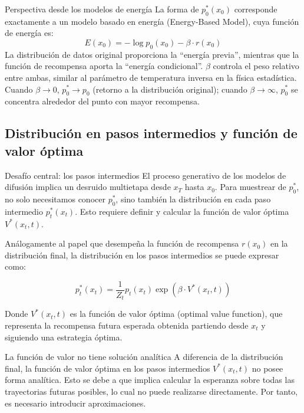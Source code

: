 \documentclass[a4paper]{article}
\begin{document}
\begin{knowledgebox}{Perspectiva desde los modelos de energía}
La forma de $p_0^*(x_0)$ corresponde exactamente a un modelo basado en energía (Energy-Based Model), cuya función de energía es:
$$E(x_0) = -\log p_0(x_0) - \beta \cdot r(x_0)$$
La distribución de datos original proporciona la ``energía previa'', mientras que la función de recompensa aporta la ``energía condicional''. $\beta$ controla el peso relativo entre ambas, similar al parámetro de temperatura inversa en la física estadística. Cuando $\beta \to 0$, $p_0^* \to p_0$ (retorno a la distribución original); cuando $\beta \to \infty$, $p_0^*$ se concentra alrededor del punto con mayor recompensa.
\end{knowledgebox}

\subsection{Distribución en pasos intermedios y función de valor óptima}

\begin{importantbox}{Desafío central: los pasos intermedios}
El proceso generativo de los modelos de difusión implica un desruido multietapa desde $x_T$ hasta $x_0$. Para muestrear de $p_0^*$, no solo necesitamos conocer $p_0^*$, sino también la distribución en cada paso intermedio $p_t^*(x_t)$. Esto requiere definir y calcular la función de valor óptima $V^*(x_t, t)$.
\end{importantbox}

Análogamente al papel que desempeña la función de recompensa $r(x_0)$ en la distribución final, la distribución en los pasos intermedios se puede expresar como:

$$p_t^*(x_t) = \frac{1}{Z_t} p_t(x_t) \exp(\beta \cdot V^*(x_t, t))$$

Donde $V^*(x_t, t)$ es la función de valor óptima (optimal value function), que representa la recompensa futura esperada obtenida partiendo desde $x_t$ y siguiendo una estrategia óptima.

\begin{warningbox}{La función de valor no tiene solución analítica}
A diferencia de la distribución final, la función de valor óptima en los pasos intermedios $V^*(x_t, t)$ no posee forma analítica. Esto se debe a que implica calcular la esperanza sobre todas las trayectorias futuras posibles, lo cual no puede realizarse directamente. Por tanto, es necesario introducir aproximaciones.
\end{warningbox}
\end{document}
